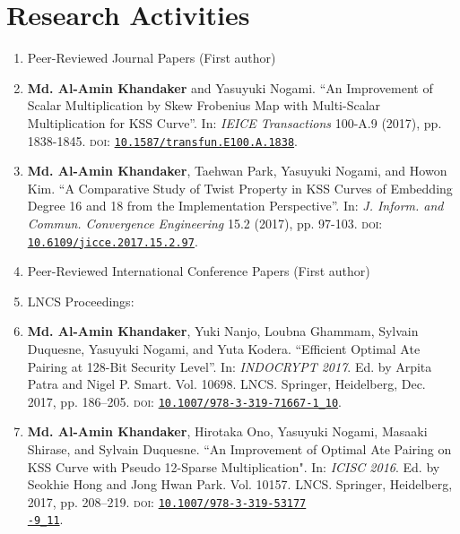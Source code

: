 \newpage
\clearpage
\pagestyle{plain}
\chapter{Research Activities} 
\label{research_activity}
\begin{enumerate}
	\Large
	\item[] Peer-Reviewed Journal Papers  (First author)
	\normalsize
	\item \textbf{Md. Al-Amin Khandaker} and Yasuyuki Nogami. “An Improvement of Scalar Multiplication by Skew Frobenius Map with Multi-Scalar Multiplication for KSS Curve”. In: \textit{IEICE Transactions} 100-A.9 (2017), pp. 1838-1845. \textsc{doi}: \href{https://doi.org/10.1587/transfun.E100.A.1838}{\texttt{10.1587/transfun.E100.A.1838}}.

	\normalsize
	\item\textbf{Md. Al-Amin Khandaker}, Taehwan Park, Yasuyuki Nogami, and Howon Kim. “A Comparative Study of Twist Property in KSS Curves of Embedding Degree 16 and 18 from the Implementation Perspective”. In: \textit{J. Inform. and Commun. Convergence Engineering} 15.2 (2017),  pp. 97-103. \textsc{doi}: \href{https://doi.org/10.6109/jicce.2017.15.2.97}{\texttt{10.6109/jicce.2017.15.2.97}}.
\vspace{10mm}
	\item[ ] \Large Peer-Reviewed International Conference Papers  (First author)
\normalsize
	\item[ ] \Large LNCS Proceedings:
	\normalsize
	\item \textbf{Md. Al-Amin Khandaker}, Yuki Nanjo, Loubna Ghammam, Sylvain Duquesne, Yasuyuki Nogami, and Yuta Kodera. “Efficient Optimal Ate Pairing at 128-Bit Security Level”. In: \textit{INDOCRYPT 2017}. Ed. by Arpita Patra
	and Nigel P. Smart. Vol. 10698. LNCS. Springer, Heidelberg, Dec. 2017, pp. 186–205. \textsc{doi}: \href{https://doi.org/10.1007/978-3-319-71667-1_10}{\texttt{10.1007/978-3-319-71667-1\_10}}.
	
	\item \textbf{Md. Al-Amin Khandaker}, Hirotaka Ono, Yasuyuki Nogami, Masaaki Shirase, and Sylvain Duquesne. ``An Improvement of Optimal Ate Pairing
	on KSS Curve with Pseudo 12-Sparse Multiplication". In: \textit{ICISC 2016}. Ed. by Seokhie Hong and Jong Hwan Park. Vol. 10157. LNCS. Springer, Heidelberg, 2017, pp. 208–219. \textsc{doi}: \href{https://doi.org/10.1007/978-3-319-53177-9_11}{\texttt{10.1007/978-3-319-53177\\-9\_11}}.
	

\end{enumerate}
